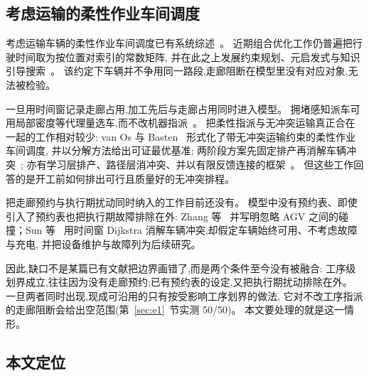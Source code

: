 \documentclass[manuscript,screen,review]{acmart}
\newcommand{\NPairs}{50}
\newcommand{\PassMiss}{\NPairs/\NPairs}      %
\begin{document}
\subsection{考虑运输的柔性作业车间调度}
\label{sec:rw_position}

考虑运输车辆的柔性作业车间调度已有系统综述~\cite{xin2025review}。
近期组合优化工作仍普遍把行驶时间取为按位置对索引的常数矩阵,
并在此之上发展约束规划、元启发式与知识引导搜索~\cite{meng2025cp,qin2026knowledge,fu2025integrated}。
该约定下车辆并不争用同一路段,走廊阻断在模型里没有对应对象,无法被检验。

一旦用时间窗记录走廊占用,加工先后与走廊占用同时进入模型。
拥堵感知派车可用局部密度等代理量选车,而不改机器指派~\cite{kim2026congestion}。
把柔性指派与无冲突运输真正合在一起的工作相对较少:
van Os 与 Basten~\cite{vanos2026exact} 形式化了带无冲突运输约束的柔性作业车间调度,
并以分解方法给出可证最优基准;
两阶段方案先固定排产再消解车辆冲突~\cite{sun2023integrated};
亦有学习层排产、路径层消冲突、并以有限反馈连接的框架~\cite{li2026framework}。
但这些工作回答的是开工前如何排出可行且质量好的无冲突排程。

把走廊预约与执行期扰动同时纳入的工作目前还没有。
模型中没有预约表、即使引入了预约表也把执行期故障排除在外:
Zhang 等~\cite{zhang2023energy} 并写明忽略 AGV 之间的碰撞；Sun 等~\cite{sun2023integrated}
用时间窗 Dijkstra 消解车辆冲突,却假定车辆始终可用、不考虑故障与充电,
并把设备维护与故障列为后续研究。

因此,缺口不是某篇已有文献把边界画错了,而是两个条件至今没有被融合:
工序级划界成立,往往因为没有走廊预约;已有预约表的设定,又把执行期扰动排除在外。
一旦两者同时出现,现成可沿用的只有按受影响工序划界的做法,
它对不改工序指派的走廊阻断会给出空范围(第~\ref{sec:e1}~节实测 \PassMiss)。
本文要处理的就是这一情形。

\subsection{本文定位}
\label{sec:rw_claim}
\end{document}
